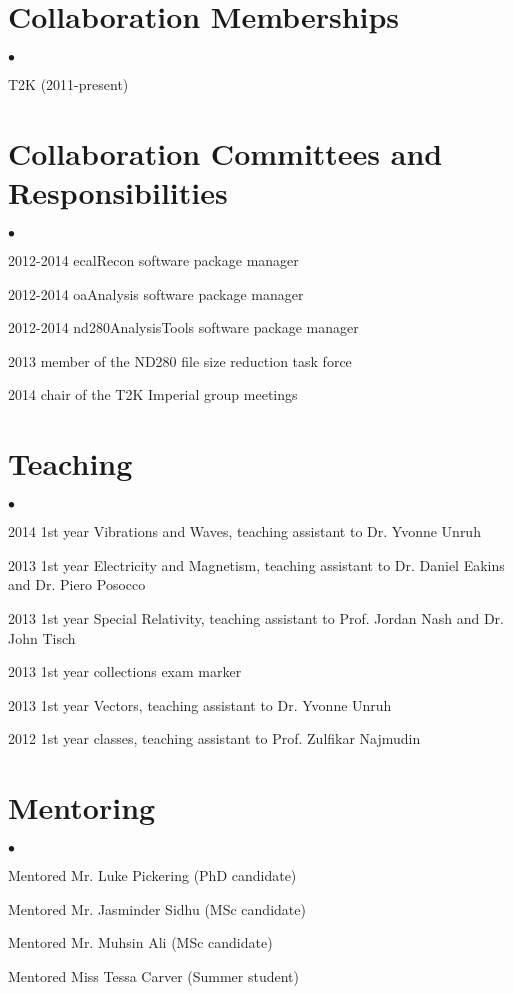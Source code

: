 \documentclass[margin,line]{res}
\newenvironment{list2}{
  \begin{list}{$\bullet$}{%
      \setlength{\itemsep}{0in}
      \setlength{\parsep}{0in} \setlength{\parskip}{0in}
      \setlength{\topsep}{0in} \setlength{\partopsep}{0in} 
      \setlength{\leftmargin}{0.2in}}}{\end{list}}
\begin{document}
\begin{resume}
\section{\sc Collaboration Memberships} 
\begin{list2}
\item T2K (2011-present)


\end{list2}

\section{\sc Collaboration Committees and Responsibilities} 
\begin{list2}
\item 2012-2014 ecalRecon software package manager
\item 2012-2014 oaAnalysis software package manager
\item 2012-2014 nd280AnalysisTools software package manager
\item 2013 member of the ND280 file size reduction task force
\item 2014 chair of the T2K Imperial group meetings


\end{list2}

\section{\sc Teaching }
\begin{list2}
\item 2014 1st year Vibrations and Waves, teaching assistant to Dr. Yvonne Unruh
\item 2013 1st year Electricity and Magnetism, teaching assistant to Dr. Daniel Eakins and Dr. Piero Posocco
\item 2013 1st year Special Relativity, teaching assistant to Prof. Jordan Nash and Dr. John Tisch
\item 2013 1st year collections exam marker
\item 2013 1st year Vectors, teaching assistant to Dr. Yvonne Unruh
\item 2012 1st year classes, teaching assistant to Prof. Zulfikar Najmudin

\end{list2}

\section{\sc Mentoring }
\begin{list2}
\item Mentored Mr. Luke Pickering (PhD candidate)
\item Mentored Mr. Jasminder Sidhu (MSc candidate)
\item Mentored Mr. Muhsin Ali (MSc candidate)
\item Mentored Miss Tessa Carver (Summer student)



\end{list2}
\end{resume}
\end{document}
